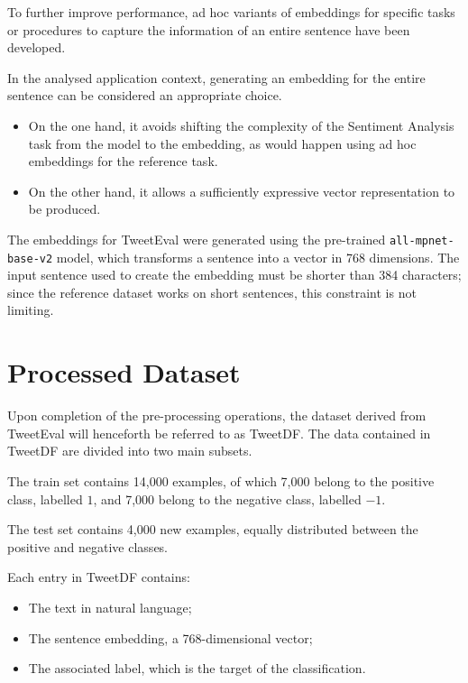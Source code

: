To further improve performance, ad hoc variants of embeddings for specific tasks\cite{sentimentEmbedding} or procedures to capture the information of an entire sentence\cite{sentence-bert} have been developed.

In the analysed application context, generating an embedding for the entire sentence can be considered an appropriate choice. 
\begin{itemize}
    \item On the one hand, it avoids shifting the complexity of the Sentiment Analysis task from the model to the embedding, as would happen using ad hoc embeddings for the reference task.
    \item On the other hand, it allows a sufficiently expressive vector representation to be produced.
\end{itemize}

The embeddings for TweetEval were generated using the pre-trained \verb|all-mpnet-base-v2| model, which transforms a sentence into a vector in 768 dimensions. The input sentence used to create the embedding must be shorter than 384 characters; since the reference dataset works on short sentences, this constraint is not limiting.

\section{Processed Dataset}

Upon completion of the pre-processing operations, the dataset derived from TweetEval will henceforth be referred to as TweetDF. The data contained in TweetDF are divided into two main subsets.

The train set contains 14,000 examples, of which 7,000 belong to the positive class, labelled $1$, and 7,000 belong to the negative class, labelled $-1$.

The test set contains 4,000 new examples, equally distributed between the positive and negative classes.

Each entry in TweetDF contains:
\begin{itemize}
    \item The text in natural language;
    \item The sentence embedding, a 768-dimensional vector;
    \item The associated label, which is the target of the classification.
\end{itemize}

